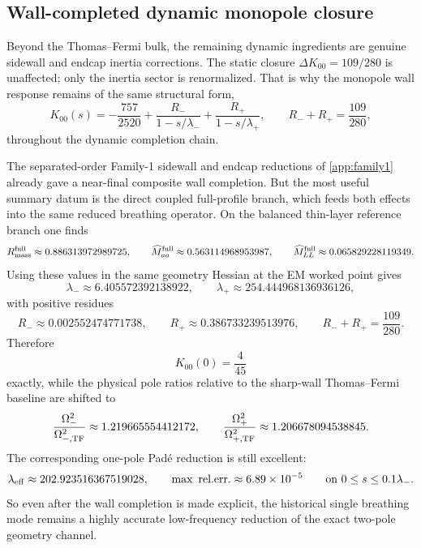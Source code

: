 \documentclass[11pt]{article}
\begin{document}
\subsection{Wall-completed dynamic monopole closure}
\label{app:geom-breathing-wall-completed}

Beyond the Thomas--Fermi bulk, the remaining dynamic ingredients are genuine sidewall and
endcap inertia corrections.
The static closure \(\Delta K_{00}=109/280\) is unaffected; only the inertia sector is
renormalized.
That is why the monopole wall response remains of the same structural form,
\begin{equation}
K_{00}(s)
=
-\frac{757}{2520}
+
\frac{R_-}{1-s/\lambda_-}
+
\frac{R_+}{1-s/\lambda_+},
\qquad
R_-+R_+=\frac{109}{280},
\label{eq:geom-breathing-K00-wall-completed-general}
\end{equation}
throughout the dynamic completion chain.

The separated-order Family-1 sidewall and endcap reductions of
\cref{app:family1} already gave a near-final composite wall completion.
But the most useful summary datum is the direct coupled full-profile branch, which feeds
both effects into the same reduced breathing operator.
On the balanced thin-layer reference branch one finds
\begin{equation}
R_{\rm mass}^{\rm full}\approx 0.886313972989725,
\qquad
\widehat M_{aa}^{\rm full}\approx 0.563114968953987,
\qquad
\widehat M_{LL}^{\rm full}\approx 0.065829228119349.
\label{eq:geom-breathing-full-profile-inertia}
\end{equation}
Using these values in the same geometry Hessian at the EM worked point gives
\begin{equation}
\lambda_-\approx 6.405572392138922,
\qquad
\lambda_+\approx 254.444968136936126,
\label{eq:geom-breathing-lambdas-full}
\end{equation}
with positive residues
\begin{equation}
R_-\approx 0.002552474771738,
\qquad
R_+\approx 0.386733239513976,
\qquad
R_-+R_+=\frac{109}{280}.
\label{eq:geom-breathing-residues-full}
\end{equation}
Therefore
\begin{equation}
K_{00}(0)=\frac{4}{45}
\label{eq:geom-breathing-K00zero-full}
\end{equation}
exactly, while the physical pole ratios relative to the sharp-wall Thomas--Fermi baseline
are shifted to
\begin{equation}
\frac{\Omega_-^2}{\Omega_{-,\rm TF}^2}\approx 1.219665554412172,
\qquad
\frac{\Omega_+^2}{\Omega_{+,\rm TF}^2}\approx 1.206678094538845.
\label{eq:geom-breathing-pole-ratios-full}
\end{equation}
The corresponding one-pole Pad\'e reduction is still excellent:
\begin{equation}
\lambda_{\rm eff}\approx 202.923516367519028,
\qquad
\max\text{ rel.err.}\approx 6.89\times 10^{-5}
\qquad
\text{on }0\le s\le 0.1\lambda_-.
\label{eq:geom-breathing-lambdaeff-full}
\end{equation}
So even after the wall completion is made explicit, the historical single breathing mode
remains a highly accurate low-frequency reduction of the exact two-pole geometry channel.
\end{document}
